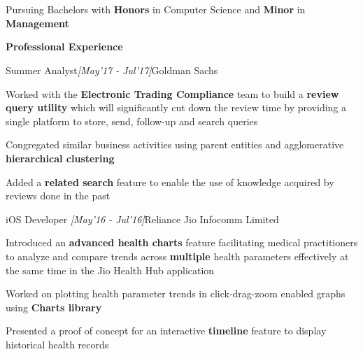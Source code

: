 \documentclass[a4paper,10pt]{resume}%
\begin{document}
\\[9\baselineskip]
\vspace{0mm}
\\
Pursuing Bachelors with \textbf{Honors} in Computer Science and \textbf{Minor} in \textbf{Management}\\

\vspace{-4.5mm}
\begin{rSection}{{\textbf{Professional Experience}}}

\begin{rSubsection}{{Summer Analyst}}{\sl \small[May'17 - Jul'17]}{Goldman Sachs}
\vspace{-1.0mm}
\item Worked with the \textbf{Electronic Trading Compliance} team to build a \textbf{review query utility} which will significantly cut down the review time by providing a single platform to store, send, follow-up and search queries 
\item Congregated similar business activities using parent entities and  agglomerative \textbf{hierarchical clustering}
\item Added a \textbf{related search} feature to enable the use of knowledge acquired by reviews done in the past
\end{rSubsection}
\vspace{-2.0mm}

\begin{rSubsection}{{iOS Developer }}{\sl \small[May'16 - Jul'16]}{Reliance Jio Infocomm Limited}
\vspace{-1.0mm}
\item Introduced an \textbf{advanced health charts} feature facilitating medical practitioners to analyze and compare trends across \textbf{multiple} health parameters effectively at the same time  in the Jio Health Hub application
\item Worked on plotting health parameter trends in click-drag-zoom enabled graphs using \textbf{Charts library}
\item Presented a proof of concept for an interactive \textbf{timeline} feature to display historical health records
\end{rSubsection}
\vspace{-2.0mm}


\end{rSection}
\end{document}
